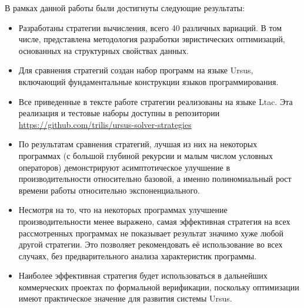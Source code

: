\documentclass[../thesis.tex]{subfiles}
\begin{document}
В рамках данной работы были достигнуты следующие результаты: 

\begin{itemize}
    \item Разработаны стратегии вычисления, всего 40 различных вариаций. В том числе, представлена методология разработки эвристических оптимизаций, основанных на структурных свойствах данных. 
    \item Для сравнения стратегий создан набор программ на языке Ursus, включающий фундаментальные конструкции языков программирования.
	\item Все приведенные в тексте работе стратегии реализованы на языке Ltac. Эта реализация и тестовые наборы доступны в репозитории \url{https://github.com/trilis/ursus-solver-strategies}
    \item По результатам сравнения стратегий, лучшая из них на некоторых программах (с большой глубиной рекурсии и малым числом условных операторов) демонстрируют асимптотическое улучшение в производительности относительно базовой, а именно полиномиальный рост времени работы относительно экспоненциального.
    \item Несмотря на то, что на некоторых программах улучшение производительности менее выражено, самая эффективная стратегия на всех рассмотренных программах не показывает результат значимо хуже любой другой стратегии. Это позволяет рекомендовать её использование во всех случаях, без предварительного анализа характеристик программы.
    \item Наиболее эффективная стратегия будет использоваться в дальнейших коммерческих проектах по формальной верификации, поскольку оптимизации имеют практическое значение для развития системы Ursus.
\end{itemize}
\end{document}
